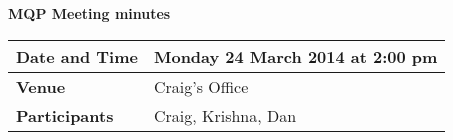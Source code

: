 \documentclass[a4wide,10pt]{extarticle}
\begin{document}
\thispagestyle{empty}

\begin{center}
\textbf{MQP Meeting minutes}
\vspace{0.33cm}
\end{center}

\begin{center}
\begin{tabular}{| m{2.8cm} | m{13.6cm} |} \hline
\textbf{Date and Time} & Monday 24 March 2014 at 2:00 pm \\ \hline
\textbf{Venue} & Craig's Office \\ \hline
\textbf{Participants} & Craig, Krishna, Dan\\ \hline
\end{tabular}
\end{center}
\end{document}
